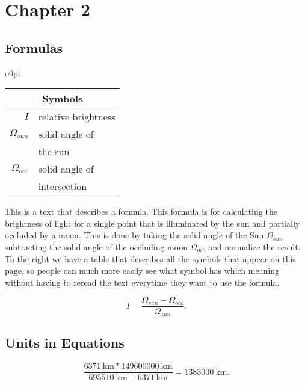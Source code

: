 \chapter{Chapter 2}\label{ch:chapter02}

\section{Formulas}\label{sec:formulas}

\begin{wraptable}{o}{0pt}
    \begin{tabular}{|r l|}
        \hline
        \multicolumn{2}{|c|}{\textbf{Symbols}} \\
        \hline
        $I$       & relative brightness \\
        $\Omega_{sun}$  & solid angle of \\
        & the sun \\
        $\Omega_{occ}$  & solid angle of \\
        & intersection \\
        \hline
    \end{tabular}
\end{wraptable}

This is a text that describes a formula.
This formula is for calculating the brightness of light for a single point that is illuminated by the sun and partially occluded by a moon.
This is done by taking the solid angle of the Sun $\Omega_{sun}$ subtracting the solid angle of the occluding moon $\Omega_{occ}$ and normalize the result.
To the right we have a table that describes all the symbols that appear on this page, so people can much more easily see what symbol has which meaning without having to reread the text everytime they want to use the formula.

\begin{equation}
    \label{eq:relative-intensity}
    I = \frac{\Omega_{sun} - \Omega_{occ}}{\Omega_{sun}}.
\end{equation}

\section{Units in Equations}\label{sec:units-in-equations}

\begin{equation}
    \frac{\SI{6371}{\kilo\meter} * \SI{149600000}{\kilo\meter}}{\SI{695510}{\kilo\meter} - \SI{6371}{\kilo\meter}} = \SI{1383000}{\kilo\meter}.\label{eq:equation-with-units}
\end{equation}

